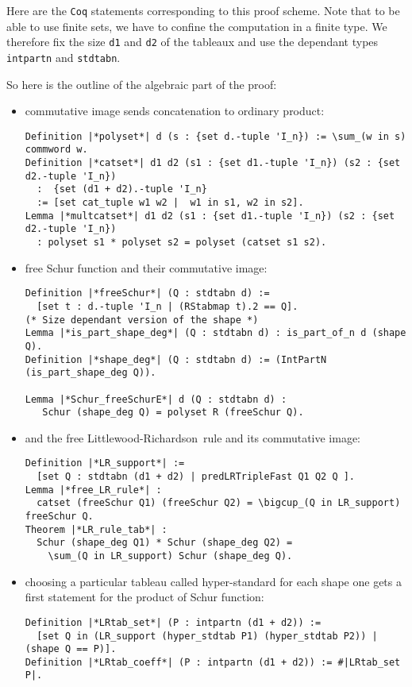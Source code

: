 \documentclass[12pt,a4paper]{article}
\let\verb=\lstinline
\newcommand{\Coq}{\texttt{Coq}\xspace}
\newcommand{\LR}{Littlewood-Richardson\ }
\begin{document}
Here are the \Coq statements corresponding to this proof scheme. Note that to
be able to use finite sets, we have to confine the computation in a finite
type. We therefore fix the size \verb{d1} and \verb{d2} of the tableaux and
use the dependant types \verb{intpartn} and \verb{stdtabn}.

So here is the outline of the algebraic part of the proof:
\begin{itemize}
\item commutative image sends concatenation to ordinary product:
\begin{lstlisting}
Definition |*polyset*| d (s : {set d.-tuple 'I_n}) := \sum_(w in s) commword w.
Definition |*catset*| d1 d2 (s1 : {set d1.-tuple 'I_n}) (s2 : {set d2.-tuple 'I_n})
  :  {set (d1 + d2).-tuple 'I_n}
  := [set cat_tuple w1 w2 |  w1 in s1, w2 in s2].
Lemma |*multcatset*| d1 d2 (s1 : {set d1.-tuple 'I_n}) (s2 : {set d2.-tuple 'I_n}) 
  : polyset s1 * polyset s2 = polyset (catset s1 s2).
\end{lstlisting}
\item free Schur function and their commutative image:
\begin{lstlisting}
Definition |*freeSchur*| (Q : stdtabn d) :=
  [set t : d.-tuple 'I_n | (RStabmap t).2 == Q].
(* Size dependant version of the shape *)
Lemma |*is_part_shape_deg*| (Q : stdtabn d) : is_part_of_n d (shape Q).
Definition |*shape_deg*| (Q : stdtabn d) := (IntPartN (is_part_shape_deg Q)).

Lemma |*Schur_freeSchurE*| d (Q : stdtabn d) :
   Schur (shape_deg Q) = polyset R (freeSchur Q).
\end{lstlisting}
\item and the free \LR rule and its commutative image:
\begin{lstlisting}
Definition |*LR_support*| :=
  [set Q : stdtabn (d1 + d2) | predLRTripleFast Q1 Q2 Q ].
Lemma |*free_LR_rule*| :
  catset (freeSchur Q1) (freeSchur Q2) = \bigcup_(Q in LR_support) freeSchur Q.
Theorem |*LR_rule_tab*| :
  Schur (shape_deg Q1) * Schur (shape_deg Q2) =
    \sum_(Q in LR_support) Schur (shape_deg Q).
\end{lstlisting}
\item choosing a particular tableau called hyper-standard for each shape
  one gets a first statement for the product of Schur function:
\begin{lstlisting}
Definition |*LRtab_set*| (P : intpartn (d1 + d2)) :=
  [set Q in (LR_support (hyper_stdtab P1) (hyper_stdtab P2)) | (shape Q == P)].
Definition |*LRtab_coeff*| (P : intpartn (d1 + d2)) := #|LRtab_set P|.


\end{lstlisting}
\end{itemize}
\end{document}
